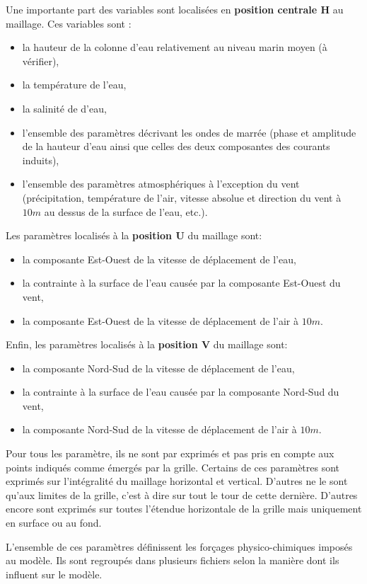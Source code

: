 \documentclass[10pt,a4paper,titlepage]{article}
\begin{document}
Une importante part des variables sont localisées en \textbf{position centrale H} au maillage.
Ces variables sont :
\begin{itemize}
    \item la hauteur de la colonne d'eau relativement au niveau marin moyen (à vérifier),
    \item la température de l'eau,
    \item la salinité de d'eau,
    \item l'ensemble des paramètres décrivant les ondes de marrée (phase et amplitude de la hauteur d'eau ainsi que celles des deux composantes des courants induits),
    \item l'ensemble des paramètres atmosphériques à l'exception du vent (précipitation, température de l'air, vitesse absolue et direction du vent à $10m$ au dessus de la surface de l'eau, etc.).
\end{itemize}
Les paramètres localisés à la \textbf{position U} du maillage sont:
\begin{itemize}
    \item la composante Est-Ouest de la vitesse de déplacement de l'eau,
    \item la contrainte à la surface de l'eau causée par la composante Est-Ouest du vent,
    \item la composante Est-Ouest de la vitesse de déplacement de l'air à $10m$.
\end{itemize}
Enfin, les paramètres localisés à la \textbf{position V} du maillage sont:
\begin{itemize}
    \item la composante Nord-Sud de la vitesse de déplacement de l'eau,
    \item la contrainte à la surface de l'eau causée par la composante Nord-Sud du vent,
    \item la composante Nord-Sud de la vitesse de déplacement de l'air à $10m$.
\end{itemize}

Pour tous les paramètre, ils ne sont par exprimés et pas pris en compte aux points indiqués comme émergés par la grille.
Certains de ces paramètres sont exprimés sur l'intégralité du maillage horizontal et vertical.
D'autres ne le sont qu'aux limites de la grille, c'est à dire sur tout le tour de cette dernière.
D'autres encore sont exprimés sur toutes l'étendue horizontale de la grille mais uniquement en surface ou au fond.

L'ensemble de ces paramètres définissent les forçages physico-chimiques imposés au modèle.
Ils sont regroupés dans plusieurs fichiers selon la manière dont ils influent sur le modèle.
\end{document}
